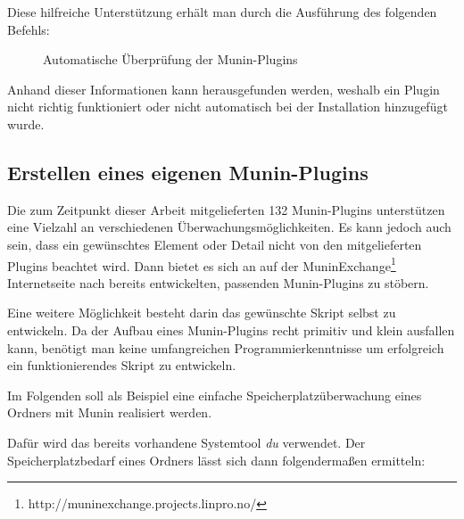 Diese hilfreiche Unterstützung erhält man durch die Ausführung des folgenden Befehls:

\begin{figure}[ht]
	\centering
		\caption{Automatische Überprüfung der Munin-Plugins}
		\label{suggest}
\end{figure}

Anhand dieser Informationen kann herausgefunden werden, weshalb ein Plugin nicht richtig funktioniert oder nicht automatisch bei der Installation hinzugefügt wurde.
\newpage
\subsection{Erstellen eines eigenen Munin-Plugins}

Die zum Zeitpunkt dieser Arbeit mitgelieferten 132 Munin-Plugins unterstützen eine Vielzahl an verschiedenen Überwachungsmöglichkeiten.
Es kann jedoch auch sein, dass ein gewünschtes Element oder Detail nicht von den mitgelieferten Plugins beachtet wird.
Dann bietet es sich an auf der MuninExchange\footnote{http://muninexchange.projects.linpro.no/} Internetseite nach bereits entwickelten, passenden Munin-Plugins zu stöbern.

Eine weitere Möglichkeit besteht darin das gewünschte Skript selbst zu entwickeln.
Da der Aufbau eines Munin-Plugins recht primitiv und klein ausfallen kann, benötigt man keine umfangreichen Programmierkenntnisse um erfolgreich ein funktionierendes Skript zu entwickeln.

Im Folgenden soll als Beispiel eine einfache Speicherplatzüberwachung eines Ordners mit Munin realisiert werden.

Dafür wird das bereits vorhandene Systemtool \textit{du} verwendet.
Der Speicherplatzbedarf eines Ordners lässt sich dann folgendermaßen ermitteln:

